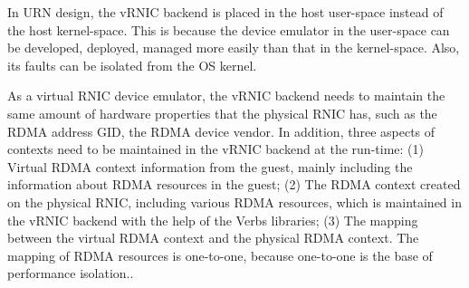 In URN design, the vRNIC backend is placed in the host user-space instead of the host kernel-space. This is because the device emulator in the user-space can be developed, deployed, managed more easily than that in the kernel-space. Also, its faults can be isolated from the OS kernel.

As a virtual RNIC device emulator, the vRNIC backend needs to maintain the same amount of hardware properties that the physical RNIC has, such as the RDMA address GID, the RDMA device vendor. In addition, three aspects of contexts need to be maintained in the vRNIC backend at the run-time:
(1) Virtual RDMA context information from the guest, mainly including the information about RDMA resources in the guest;
(2) The RDMA context created on the physical RNIC,  including various RDMA resources, which is maintained in the vRNIC backend with the help of the Verbs libraries;
(3) The mapping between the virtual RDMA context and the physical RDMA context. The mapping of RDMA resources is one-to-one,  because one-to-one is the base of performance isolation..


